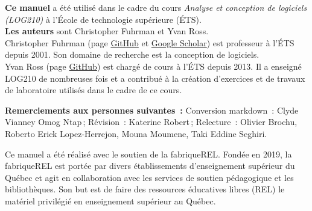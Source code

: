 \small
\textbf{Ce manuel} a été utilisé dans le cadre du cours \emph{Analyse et
conception de logiciels (LOG210)} à l'École de technologie supérieure
(ÉTS).\\
\textbf{Les auteurs} sont Christopher Fuhrman et Yvan Ross.\\
Christopher Fuhrman (page \href{https://github.com/fuhrmanator}{GitHub} et \href{https://scholar.google.com/citations?user=Qa5SpUwAAAAJ\&hl=fr\&oi=ao}{Google Scholar}) est professeur à l'ÉTS depuis 2001.
Son domaine de recherche est la conception de logiciels.\\
Yvan Ross (page \href{https://github.com/yvanross}{GitHub}) est chargé de cours à l'ÉTS depuis 2013. Il a enseigné LOG210 de nombreuses fois et a contribué à la création d'exercices et de travaux de laboratoire utilisés dans le cadre de ce cours.

\textbf{Remerciements aux personnes suivantes~:} Conversion markdown~: Clyde Vianney Omog Ntap\,; Révision~: Katerine Robert\,; Relecture~: Olivier Brochu, Roberto Erick Lopez-Herrejon, Mouna Moumene, Taki Eddine Seghiri. 


Ce manuel a été réalisé avec le soutien de la
fabriqueREL. Fondée en 2019, la fabriqueREL est
portée par divers établissements d’enseignement
supérieur du Québec et agit en collaboration avec
les services de soutien pédagogique et les
bibliothèques. Son but est de faire des ressources
éducatives libres (REL) le matériel privilégié en
enseignement supérieur au Québec.

